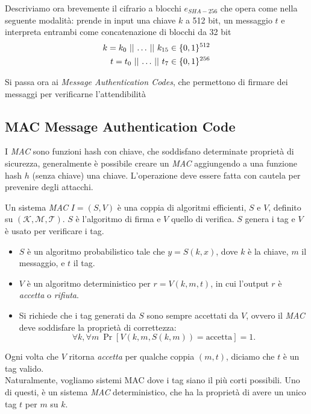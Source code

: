 \vspace{1em}
Descriviamo ora brevemente il cifrario a blocchi $e_{SHA-256}$ che opera come nella seguente modalità: 
prende in input una chiave $k$ a 512 bit, un messaggio $t$ e interpreta entrambi come concatenazione di blocchi da 32 bit
\begin{align*}
    k = k_0 \operatorname{\,||\,} \dots \operatorname{\,||\,} k_{15} \in \{0,1\}^{512}\\ 
    t = t_0 \operatorname{\,||\,} \dots \operatorname{\,||\,} t_{7} \in \{0,1\}^{256}\\
\end{align*}



Si passa ora ai \textit{Message Authentication Codes}, che permettono di firmare dei messaggi per verificarne l'attendibilità

\subsection{MAC Message Authentication Code}

I \emph{MAC} sono funzioni hash con chiave, che soddisfano determinate proprietà di sicurezza, generalmente è possibile creare un \emph{MAC} aggiungendo a una funzione hash $h$ (senza  chiave) una chiave. L'operazione deve essere fatta con cautela per prevenire degli attacchi.

\begin{definition}
    Un sistema \emph{MAC} $I=(S,V)$ è una coppia di algoritmi efficienti, $S$ e $V$, definito su $(\mathcal{K},\mathcal{M},\mathcal{T})$. $S$ è l'algoritmo di firma e $V$ quello di verifica. $S$ genera i tag e $V$ è usato per verificare i tag. 
    \begin{itemize}
        \item $S$ è un algoritmo probabilistico tale che $y = S(k,x)$, dove $k$ è la chiave, $m$ il messaggio, e $t$ il tag. 
        \item $V$ è un algoritmo deterministico per $r = V(k,m,t)$, in cui l'output $r$ è \textit{accetta} o \textit{rifiuta}. 
        \item Si richiede che i tag generati da $S$ sono sempre accettati da $V$, ovvero il \emph{MAC} deve soddisfare la proprietà di correttezza: 
        \[
        \forall k, \forall  m \ \Pr[V(k,m,S(k,m))=\text{accetta}]=1.
        \]
    \end{itemize}
    \noindent Ogni volta che $V$ ritorna \textit{accetta} per qualche coppia $(m,t)$, diciamo che $t$ è un tag valido. \\ Naturalmente, vogliamo sistemi MAC dove i tag siano il più corti possibili. Uno di questi, è un sistema \emph{MAC} deterministico, che ha la proprietà di avere un unico tag $t$ per $m$ su $k$. 
\end{definition}

